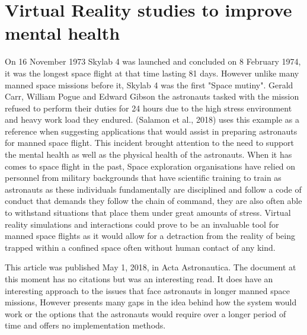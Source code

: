 \documentclass[10pt,journal,compsoc]{IEEEtran}
\begin{document}
	\section{Virtual Reality studies to improve mental health}
	 On 16 November 1973 Skylab 4 was launched and concluded on 8 February 1974, it was the longest space flight at that time lasting 81 days. However unlike many manned space missions before it, Skylab 4 was the first "Space mutiny". Gerald Carr, William Pogue and Edward Gibson the astronauts tasked with the mission refused to perform their duties for 24 hours due to the high stress environment and heavy work load they endured. (Salamon et al., 2018) uses this example as a reference when suggesting applications that would assist in preparing astronauts for manned space flight. This incident brought attention to the need to support the mental health as well as the physical health of the astronauts. When it has comes to space flight in the past, Space exploration organisations have relied on personnel from military backgrounds that have scientific training to train as astronauts as these individuals fundamentally are disciplined and follow a code of conduct that demands they follow the chain of command, they are also often able to withstand situations that place them under great amounts of stress. Virtual reality simulations and interactions could prove to be an invaluable tool for manned space flights as it would allow for a detraction from the reality of being trapped within a confined space often without human contact of any kind. \newline 
	 
	 This article was published May 1, 2018, in Acta Astronautica. The document at this moment has no citations but was an interesting read. It does have an interesting approach to the issues that face astronauts in longer manned space missions, However presents many gaps in the idea behind how the system would work or the options that the astronauts would require over a longer period of time and offers no implementation methods.\newline
	 
\end{document}
